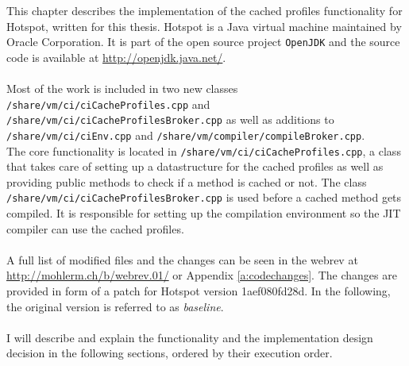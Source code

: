 This chapter describes the implementation of the cached profiles functionality for Hotspot, written for this thesis.
Hotspot is a Java virtual machine maintained by Oracle Corporation. It is part of the open source project \texttt{OpenJDK} and the source code is available at \url{http://openjdk.java.net/}.
\\\\
Most of the work is included in two new classes \texttt{/share/vm/ci/ciCacheProfiles.cpp} and \\\texttt{/share/vm/ci/ciCacheProfilesBroker.cpp} as well as additions to \texttt{/share/vm/ci/ciEnv.cpp} and \texttt{/share/vm/compiler/compileBroker.cpp}.
\\
The core functionality is located in \texttt{/share/vm/ci/ciCacheProfiles.cpp}, a class that takes care of setting up a datastructure for the cached profiles as well as providing public methods to check if a method is cached or not. The class \texttt{/share/vm/ci/ciCacheProfilesBroker.cpp} is used before a cached method gets compiled. It is responsible for setting up the compilation environment so the JIT compiler can use the cached profiles.
\\\\
A full list of modified files and the changes can be seen in the webrev at \url{http://mohlerm.ch/b/webrev.01/} or Appendix \ref{a:codechanges}.
The changes are provided in form of a patch for Hotspot version 1aef080fd28d. In the following, the original version is referred to as \textit{baseline}.
\\\\
I will describe and explain the functionality and the implementation design decision in the following sections, ordered by their execution order.

